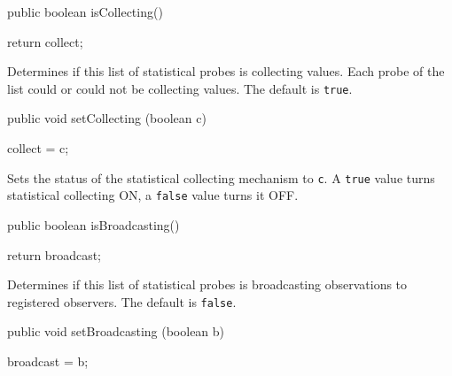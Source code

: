 \begin{htmlonly}
\end{htmlonly}
\begin{code}

   public boolean isCollecting()\begin{hide} {
      return collect;
   }\end{hide}
\end{code}
\begin{tabb}   Determines if this list of statistical probes
 is collecting values. Each probe of the list could or could not
 be collecting values. The default is \texttt{true}.
\end{tabb}
\begin{htmlonly}
\end{htmlonly}
\begin{code}

   public void setCollecting (boolean c)\begin{hide} {
      collect = c;
   }\end{hide}
\end{code}
\begin{tabb}   Sets the status of the statistical collecting
 mechanism to \texttt{c}.  A \texttt{true} value
 turns statistical collecting ON, a \texttt{false}
 value turns it OFF.
\end{tabb}
\begin{htmlonly}
\end{htmlonly}
\begin{code}

   public boolean isBroadcasting()\begin{hide} {
      return broadcast;
   }\end{hide}
\end{code}
\begin{tabb}   Determines if this list of statistical probes
 is broadcasting observations to registered observers.
 The default is \texttt{false}.
\end{tabb}
\begin{htmlonly}
\end{htmlonly}
\begin{code}

   public void setBroadcasting (boolean b)\begin{hide} {
      broadcast = b;
   }\end{hide}
\end{code}
